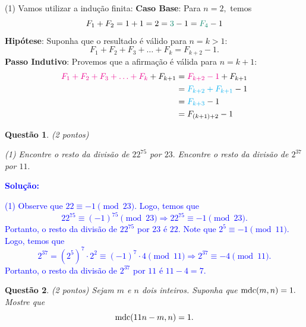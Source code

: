 \documentclass[oneside,a4paper,12pt]{article}
\newcommand{\mdc}{{\rm mdc}}
\newcommand{\negrito}[1]{\mbox{\boldmath{$#1$}}}
\theoremstyle{Colorido}
\theoremstyle{solu}
\theoremstyle{dotlessP}
\newcommand{\solucao}[1]{\textcolor{blue}{\textbf{Solução:} #1}}
\newtheorem{sol}{Questão}
\begin{document}
{\begin{tasks}[counter-format={(tsk[a])},label-width=3.6ex, label-format = {\bfseries}, column-sep = {20pt}]
\begin{align*}
\end{align*}
\end{tasks}
\begin{tasks}[counter-format={(tsk[a])},label-width=3.6ex, label-format = {\bfseries}, column-sep = {20pt}](1)
\task[\textcolor{blue}{$\negrito{(c)} $}]  Vamos utilizar a indução finita:\newline
\textbf{Caso Base}: Para $n=2,$ temos \[F_1 + F_2 = 1 + 1 = 2 = \textcolor{PineGreen}{3} - 1 = \textcolor{PineGreen}{F_4} - 1\]
\textbf{Hipótese}: Suponha que o resultado é válido para $n=k>1:$\[F_1 + F_2 + F_3 + \ldots + F_k = F_{k+2} - 1.\]
\textbf{Passo Indutivo}: Provemos que a afirmação é válida para $n=k+1:$
\begin{align*}
    \textcolor{Magenta}{F_1 + F_2 + F_3 + \ldots + F_k}+ F_{k+1} &= \textcolor{Magenta}{F_{k+2} - 1}+ F_{k+1} \\&= \textcolor{Cyan}{F_{k+2} + F_{k+1}} - 1  \\&= \textcolor{Cyan}{F_{k+3}} - 1 \\&= F_{(k+1)+2} - 1
\end{align*}
\end{tasks}}
\newpage
\begin{sol}
\textit{(2 pontos)} 
\begin{tasks}[counter-format={(tsk[a])},label-width=3.6ex, label-format = {\bfseries}, column-sep = {20pt}](1)
\task[\textcolor{blue}{$\negrito{(a)} $}]  Encontre o resto da divisão de $22^{75}$ por $23.$ 
\task[\textcolor{blue}{$\negrito{(b)} $}]  Encontre o resto da divisão de $2^{37}$ por $11.$
\end{tasks}
\end{sol}
\solucao{\begin{tasks}[counter-format={(tsk[a])},label-width=3.6ex, label-format = {\bfseries}, column-sep = {20pt}](1)
\task[\textcolor{blue}{$\negrito{(a)} $}] Observe que $22 \equiv -1 \pmod{23}.$ Logo, temos que 
\[
22^{75} \equiv (-1)^{75} \pmod{23} \Rightarrow 22^{75} \equiv -1 \pmod{23}.
\]
Portanto, o resto da divisão de $22^{75}$ por $23$ é $22.$
\task[\textcolor{blue}{$\negrito{(b)} $}] Note que $2^5 \equiv -1 \pmod{11}.$ Logo, temos que 
\[
2^{37} = (2^{5})^7 \cdot 2^2 \equiv (-1)^{7} \cdot 4 \pmod{11} \Rightarrow 2^{37} \equiv -4 \pmod{11}.
\]
Portanto, o resto da divisão de $2^{37}$ por $11$ é $11-4 = 7.$
\end{tasks}}
\begin{sol}
\textit{(2 pontos)} Sejam $m$ e $n$ dois inteiros. Suponha que $\mdc(m,n) = 1.$ Mostre que
\[\mdc(11 n -  m, n) = 1.\]
\end{sol}
\end{document}
